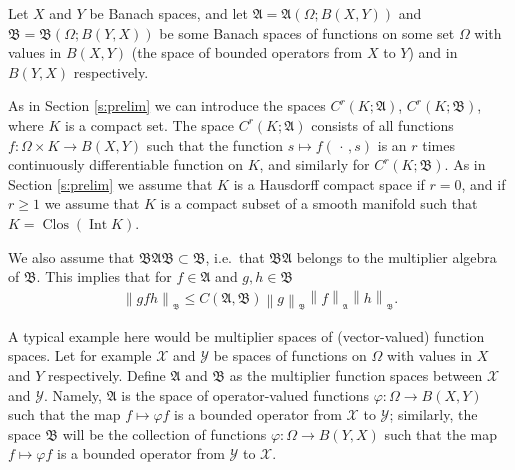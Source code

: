 \documentclass[12pt]{amsart}
\begin{document}
{\begin{list}{X}
{Let $X$ and $Y$ be Banach spaces, and let ${\mathfrak{A}}={\mathfrak{A}}\left(\Omega; B(X,Y)\right)$ and ${\mathfrak{B}}= {\mathfrak{B}}\left(\Omega;B(Y,X)\right)$ be some Banach spaces of functions  on some set $\Omega$ with values in $B(X,Y)$ (the space of bounded operators from $X$ to $Y$) and in $B(Y,X)$ respectively.

As in Section \ref{s:prelim} we can introduce the spaces $C^r\left(K;{\mathfrak{A}}\right)$, $C^r\left(K;{\mathfrak{B}}\right)$, where $K$ is a compact set.  The space $C^r\left(K;{\mathfrak{A}}\right)$ consists of all functions $f:\Omega\times K \to B(X, Y)$ such that the function $s\mapsto f({\,\cdot\,}, s)$ is an $r$ times continuously differentiable function on $K$, and similarly for $C^r\left(K;{\mathfrak{B}}\right)$. As in Section \ref{s:prelim} we assume that  $K$ is a Hausdorff compact space if $r=0$, and if $r\ge1$ we assume that $K$ is a compact subset of a smooth manifold such that $K= {\operatorname{Clos}}\left({\operatorname{Int}} K\right)$. 

We also assume that \({\mathfrak{B}}{\mathfrak{A}}{\mathfrak{B}} \subset {\mathfrak{B}}\), i.e.~that \({\mathfrak{B}}{\mathfrak{A}}\) belongs to the multiplier algebra of \({\mathfrak{B}}\). This implies that for \(f\in{\mathfrak{A}}\) and \(g, h\in {\mathfrak{B}}\)
\begin{align}
\label{mult-01}
\left\| g f h \right\|{_{ {}_{\scriptstyle {\mathfrak{B}}}}} 
\le C({\mathfrak{A}}, {\mathfrak{B}}) \left\|g\right\|{_{ {}_{\scriptstyle {\mathfrak{B}}}}} \left\|f\right\|{_{ {}_{\scriptstyle {\mathfrak{A}}}}} \left\|h\right\|{_{ {}_{\scriptstyle {\mathfrak{B}}}}}  .
\end{align}

A typical example here would be multiplier spaces of (vector-valued) function spaces. Let for example \({\mathcal{X}}\) and \({\mathcal{Y}}\) be  spaces of functions  on \(\Omega\) with values in \(X\) and \(Y\) respectively. Define  \({\mathfrak{A}}\) and \({\mathfrak{B}}\) as the multiplier function spaces between \({\mathcal{X}}\) and \({\mathcal{Y}}\). Namely, \( {\mathfrak{A}} \) is the space of operator-valued functions \( {\varphi} :\Omega \to B(X, Y) \) such that the map \( f\mapsto {\varphi} f\) is a bounded operator from \({\mathcal{X}}\) to \({\mathcal{Y}}\); similarly, the space \({\mathfrak{B}}\) will be the collection of functions \({\varphi}:\Omega \to B(Y,X) \) such that the map \( f\mapsto {\varphi} f\) is a bounded operator from  \({\mathcal{Y}}\) to \({\mathcal{X}}\).  

}
\end{list}}
\end{document}
